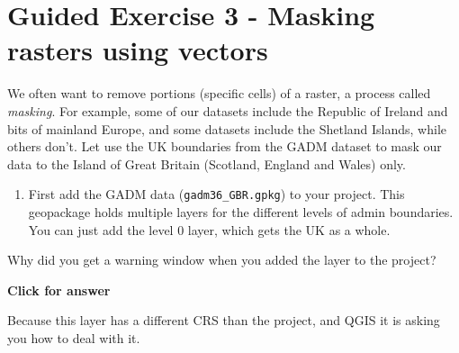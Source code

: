 \documentclass[
  letterpaper,
  DIV=11,
  numbers=noendperiod]{scrreprt}
\providecommand{\tightlist}{%
  \setlength{\itemsep}{0pt}\setlength{\parskip}{0pt}}\usepackage{longtable,booktabs,array}
\begin{document}
\section{Guided Exercise 3 - Masking rasters using
vectors}\label{guided-exercise-3---masking-rasters-using-vectors}

We often want to remove portions (specific cells) of a raster, a process
called \emph{masking}. For example, some of our datasets include the
Republic of Ireland and bits of mainland Europe, and some datasets
include the Shetland Islands, while others don't. Let use the UK
boundaries from the GADM dataset to mask our data to the Island of Great
Britain (Scotland, England and Wales) only.

\begin{enumerate}
\def\labelenumi{(\arabic{enumi})}
\setcounter{enumi}{123}
\tightlist
\item
  First add the GADM data (\texttt{gadm36\_GBR.gpkg}) to your project.
  This geopackage holds multiple layers for the different levels of
  admin boundaries. You can just add the level 0 layer, which gets the
  UK as a whole.
\end{enumerate}

\begin{tcolorbox}[enhanced jigsaw, coltitle=black, toprule=.15mm, breakable, opacitybacktitle=0.6, left=2mm, colback=white, leftrule=.75mm, rightrule=.15mm, colbacktitle=quarto-callout-important-color!10!white, toptitle=1mm, titlerule=0mm, colframe=quarto-callout-important-color-frame, arc=.35mm, bottomtitle=1mm, opacityback=0, bottomrule=.15mm, title=\textcolor{quarto-callout-important-color}{\faExclamation}\hspace{0.5em}{Stop and Think}]

Why did you get a warning window when you added the layer to the
project?

\end{tcolorbox}

\begin{tcolorbox}[enhanced jigsaw, toprule=.15mm, breakable, left=2mm, colframe=quarto-callout-important-color-frame, colback=white, arc=.35mm, leftrule=.75mm, opacityback=0, rightrule=.15mm, bottomrule=.15mm]

\vspace{-3mm}\textbf{Click for answer}\vspace{3mm}

Because this layer has a different CRS than the project, and QGIS it is
asking you how to deal with it.

\end{tcolorbox}
\end{document}
